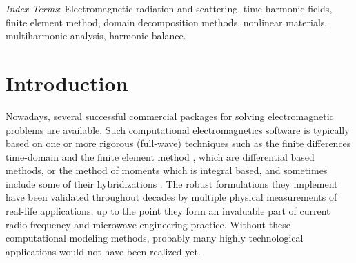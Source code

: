 \vfill
\noindent \textit{Index Terms}: Electromagnetic radiation and scattering, time-harmonic fields, finite element method, domain decomposition methods, nonlinear materials, multiharmonic analysis, harmonic balance.
\thispagestyle{empty}
%
\cleardoublepage
\setcounter{secnumdepth}{5}
\setcounter{tocdepth}{5}
\tableofcontents
\newpage
\thispagestyle{empty}
\listoffigures
\newpage
\thispagestyle{empty}
\listoftables
\listofalgorithms
%
\thispagestyle{empty}
\cleardoublepage

\chapter{Introduction} \label{chap:INT}

Nowadays, several successful commercial packages for solving electromagnetic problems are available. Such computational electromagnetics software is typically based on one or more  rigorous (full-wave) techniques such as the finite differences time-domain \cite{CSTMWS, SEMCADX} and the finite element method \cite{ComsolRF, HFSS}, which are differential based methods, or the method of moments \cite{FEKO} which is integral based, and sometimes include some of their hybridizations \cite{Garg2008, Davidson2011, RIB2011}. The robust formulations they implement have been validated throughout decades by multiple physical measurements of real-life applications, up to the point they form an invaluable part of current radio frequency and microwave engineering practice. Without these computational modeling methods, probably many highly technological applications would not have been realized yet.

